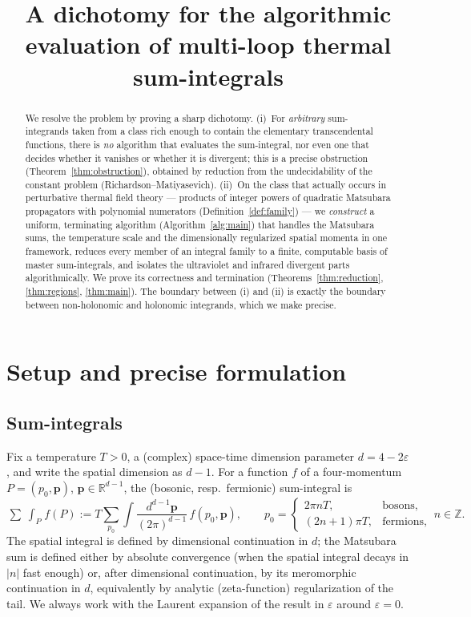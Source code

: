 \documentclass{amsart}
\theoremstyle{definition}
\begin{document}
\title{A dichotomy for the algorithmic evaluation of multi-loop thermal sum-integrals}
\maketitle

\begin{abstract}
We resolve the problem by proving a sharp dichotomy. (i)~For \emph{arbitrary}
sum-integrands taken from a class rich enough to contain the elementary
transcendental functions, there is \emph{no} algorithm that evaluates the
sum-integral, nor even one that decides whether it vanishes or whether it is
divergent; this is a precise obstruction (Theorem~\ref{thm:obstruction}),
obtained by reduction from the undecidability of the constant problem
(Richardson--Matiyasevich). (ii)~On the class that actually occurs in
perturbative thermal field theory --- products of integer powers of quadratic
Matsubara propagators with polynomial numerators (Definition~\ref{def:family})
--- we \emph{construct} a uniform, terminating algorithm
(Algorithm~\ref{alg:main}) that handles the Matsubara sums, the temperature
scale and the dimensionally regularized spatial momenta in one framework,
reduces every member of an integral family to a finite, computable basis of
master sum-integrals, and isolates the ultraviolet and infrared divergent
parts algorithmically. We prove its correctness and termination
(Theorems~\ref{thm:reduction}, \ref{thm:regions}, \ref{thm:main}). The
boundary between (i) and (ii) is exactly the boundary between non-holonomic and
holonomic integrands, which we make precise.
\end{abstract}

\section{Setup and precise formulation}

\subsection{Sum-integrals}
Fix a temperature $T>0$, a (complex) space-time dimension parameter
$d=4-2\varepsilon$, and write the spatial dimension as $d-1$. For a function
$f$ of a four-momentum $P=(p_0,\mathbf p)$, $\mathbf p\in\mathbb R^{d-1}$,
the (bosonic, resp.\ fermionic) sum-integral is
\begin{equation}\label{eq:sumint}
  \mathop{\textstyle\sum\!\!\!\!\!\!\int}_P f(P)
  := T\sum_{p_0}\int\!\frac{d^{d-1}\mathbf p}{(2\pi)^{d-1}}\, f(p_0,\mathbf p),
  \qquad
  p_0=\begin{cases}2\pi n T,&\text{bosons,}\\(2n+1)\pi T,&\text{fermions,}\end{cases}
  \ n\in\mathbb Z .
\end{equation}
The spatial integral is defined by dimensional continuation in $d$; the
Matsubara sum is defined either by absolute convergence (when the spatial
integral decays in $|n|$ fast enough) or, after dimensional continuation, by
its meromorphic continuation in $d$, equivalently by analytic
(zeta-function) regularization of the tail. We always work with the Laurent
expansion of the result in $\varepsilon$ around $\varepsilon=0$.
\end{document}
